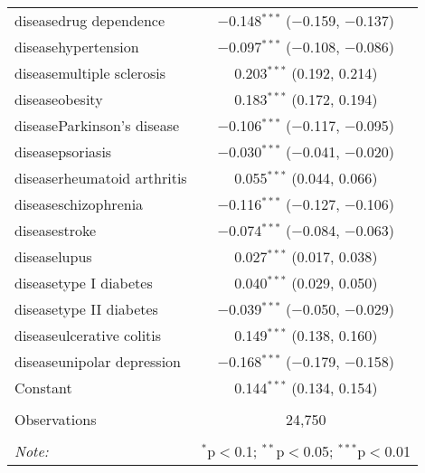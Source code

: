 \begin{table}[!htbp]
\begin{tabular}{@{\extracolsep{5pt}}lc}
  diseasedrug dependence & $-$0.148$^{***}$ ($-$0.159, $-$0.137) \\ 
  diseasehypertension & $-$0.097$^{***}$ ($-$0.108, $-$0.086) \\ 
  diseasemultiple sclerosis & 0.203$^{***}$ (0.192, 0.214) \\ 
  diseaseobesity & 0.183$^{***}$ (0.172, 0.194) \\ 
  diseaseParkinson's disease & $-$0.106$^{***}$ ($-$0.117, $-$0.095) \\ 
  diseasepsoriasis & $-$0.030$^{***}$ ($-$0.041, $-$0.020) \\ 
  diseaserheumatoid arthritis & 0.055$^{***}$ (0.044, 0.066) \\ 
  diseaseschizophrenia & $-$0.116$^{***}$ ($-$0.127, $-$0.106) \\ 
  diseasestroke & $-$0.074$^{***}$ ($-$0.084, $-$0.063) \\ 
  diseaselupus & 0.027$^{***}$ (0.017, 0.038) \\ 
  diseasetype I diabetes & 0.040$^{***}$ (0.029, 0.050) \\ 
  diseasetype II diabetes & $-$0.039$^{***}$ ($-$0.050, $-$0.029) \\ 
  diseaseulcerative colitis & 0.149$^{***}$ (0.138, 0.160) \\ 
  diseaseunipolar depression & $-$0.168$^{***}$ ($-$0.179, $-$0.158) \\ 
  Constant & 0.144$^{***}$ (0.134, 0.154) \\ 
 \hline \\[-1.8ex] 
Observations & 24,750 \\ 
\hline 
\hline \\[-1.8ex] 
\textit{Note:}  & \multicolumn{1}{r}{$^{*}$p$<$0.1; $^{**}$p$<$0.05; $^{***}$p$<$0.01} \\ 
\end{tabular} 
\end{table} 
